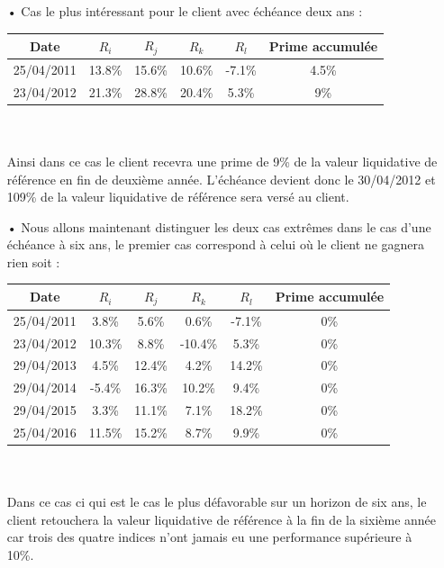 \documentclass[french,12pt,a4paper]{article}
\begin{document}
\begin{itemize}
\item[•]
Cas le plus intéressant pour le client avec échéance deux ans :\\
\begin{spacing}{1.2}
\begin{center}
\begin{tabular}{|c|c|c|c|c|c|}
  \hline
  Date & $R_{i}$ & $R_{j}$ & $R_{k}$ & $R_{l}$ & Prime accumulée \\
  \hline
  25/04/2011 & 13.8\% & 15.6\% & 10.6\% & -7.1\% & 4.5\% \\
  23/04/2012 & 21.3\% & 28.8\% & 20.4\% & 5.3\% & 9\% \\
  \hline
\end{tabular}
\end{center}
\end{spacing}
\indent \\
\indent \\
Ainsi dans ce cas le client recevra une prime de 9\% de la valeur liquidative de référence en fin de deuxième année. L'échéance devient donc le 30/04/2012 et 109\% de la valeur liquidative de référence sera versé au client.\\

\item[•]
Nous allons maintenant distinguer les deux cas extrêmes dans le cas d'une échéance à six ans, le premier cas correspond à celui où le client ne gagnera rien soit :\\
\begin{spacing}{1.2}
\begin{center}
\begin{tabular}{|c|c|c|c|c|c|}
  \hline
  Date & $R_{i}$ & $R_{j}$ & $R_{k}$ & $R_{l}$ & Prime accumulée \\
  \hline
  25/04/2011 & 3.8\% & 5.6\% & 0.6\% & -7.1\% & 0\% \\
  23/04/2012 & 10.3\% & 8.8\% & -10.4\% & 5.3\% & 0\% \\
  29/04/2013 & 4.5\% & 12.4\% & 4.2\% & 14.2\% & 0\%\\
  29/04/2014 & -5.4\% & 16.3\% & 10.2\% & 9.4\% & 0\%\\
  29/04/2015 & 3.3\% & 11.1\% & 7.1\% & 18.2\% & 0\%\\
  25/04/2016 & 11.5\% & 15.2\% & 8.7\% & 9.9\% & 0\%\\
  \hline
\end{tabular}
\end{center}
\end{spacing}
\indent \\
\indent \\
Dans ce cas ci qui est le cas le plus défavorable sur un horizon de six ans, le client retouchera la valeur liquidative de référence à la fin de la sixième année car trois des quatre indices n'ont jamais eu une performance supérieure à 10\%.\\


\end{itemize}
\end{document}
